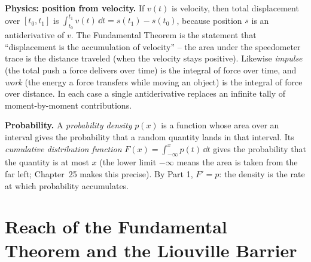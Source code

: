 \begin{applicationbox}
\textbf{Physics: position from velocity.} If $v(t)$ is velocity, then total
displacement over $[t_0,t_1]$ is $\int_{t_0}^{t_1} v(t)\,\dd t = s(t_1)-s(t_0)$,
because position $s$ is an antiderivative of $v$. The Fundamental Theorem is the
statement that ``displacement is the accumulation of velocity'' -- the area under
the speedometer trace is the distance traveled (when the velocity stays
positive). Likewise \emph{impulse} (the total push a force delivers over time) is
the integral of force over time, and \emph{work} (the energy a force transfers
while moving an object) is the integral of force over distance. In each case a
single antiderivative replaces an infinite tally of moment-by-moment
contributions.

\textbf{Probability.} A \emph{probability density} $p(x)$ is a function whose area
over an interval gives the probability that a random quantity lands in that
interval. Its \emph{cumulative distribution function}
$F(x)=\int_{-\infty}^x p(t)\,\dd t$ gives the probability that the quantity is at
most $x$ (the lower limit $-\infty$ means the area is taken from the far left;
Chapter~25 makes this precise). By Part 1, $F'=p$: the density is the rate at
which probability accumulates.
\end{applicationbox}

\section{Reach of the Fundamental Theorem and the Liouville Barrier}

